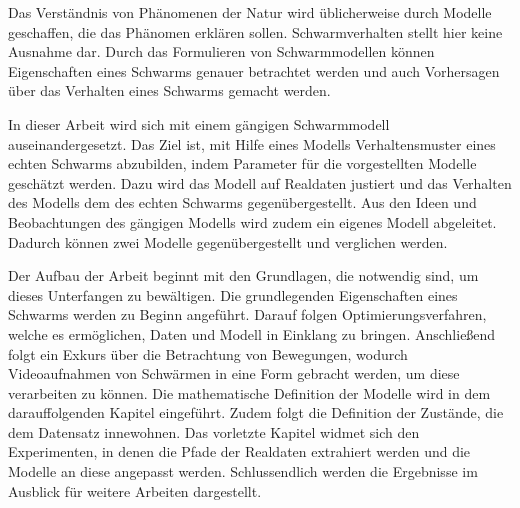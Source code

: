 Das Verständnis von Phänomenen der Natur wird üblicherweise durch Modelle geschaffen, die das Phänomen erklären sollen.
Schwarmverhalten stellt hier keine Ausnahme dar. Durch das Formulieren von Schwarmmodellen können Eigenschaften eines Schwarms genauer betrachtet werden und auch Vorhersagen über das Verhalten eines Schwarms gemacht werden.

In dieser Arbeit wird sich mit einem gängigen Schwarmmodell auseinandergesetzt. Das Ziel ist, mit Hilfe eines Modells Verhaltensmuster eines echten Schwarms abzubilden, indem Parameter für die vorgestellten Modelle geschätzt werden. Dazu wird das Modell auf Realdaten justiert und das Verhalten des Modells dem des echten Schwarms gegenübergestellt. Aus den Ideen und Beobachtungen des gängigen Modells wird zudem ein eigenes Modell abgeleitet.
Dadurch können zwei Modelle gegenübergestellt und verglichen werden.

Der Aufbau der Arbeit beginnt mit den Grundlagen, die notwendig sind, um dieses Unterfangen zu bewältigen.
Die grundlegenden Eigenschaften eines Schwarms werden zu Beginn angeführt. Darauf folgen Optimierungsverfahren, welche es ermöglichen, Daten und Modell in Einklang zu bringen. Anschließend folgt ein Exkurs über die Betrachtung von Bewegungen, wodurch Videoaufnahmen von Schwärmen in eine Form gebracht werden, um diese verarbeiten zu können. Die mathematische Definition der Modelle wird in dem darauffolgenden Kapitel eingeführt. Zudem folgt die Definition der Zustände, die dem Datensatz innewohnen.
Das vorletzte Kapitel widmet sich den Experimenten, in denen die Pfade der Realdaten extrahiert werden und die Modelle an diese angepasst werden. Schlussendlich werden die Ergebnisse im Ausblick für weitere Arbeiten dargestellt.


